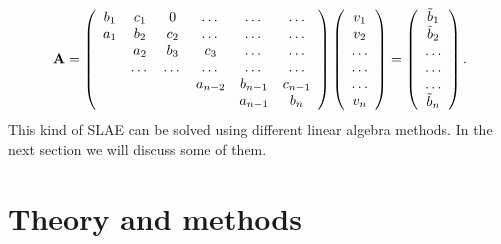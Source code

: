 \documentclass[10pt]{article}
\begin{document}
\begin{equation}
    {\bf A} = \left(\begin{array}{cccccc}
                           b_1& c_1 & 0 &\dots   & \dots &\dots \\
                           a_1 & b_2 & c_2 &\dots &\dots &\dots \\
                           & a_2 & b_3 & c_3 & \dots & \dots \\
                           & \dots   & \dots &\dots   &\dots & \dots \\
                           &   &  &a_{n-2}  &b_{n-1}& c_{n-1} \\
                           &    &  &   &a_{n-1} & b_n \\
                      \end{array} \right)\left(\begin{array}{c}
                           v_1\\
                           v_2\\
                           \dots \\
                          \dots  \\
                          \dots \\
                           v_n\\
                      \end{array} \right)
  =\left(\begin{array}{c}
                           \tilde{b}_1\\
                           \tilde{b}_2\\
                           \dots \\
                           \dots \\
                          \dots \\
                           \tilde{b}_n\\
                      \end{array} \right).
\end{equation}
This kind of SLAE can be solved using different linear algebra methods. In the next section we will discuss some of them.
\section{Theory and methods}
\end{document}
